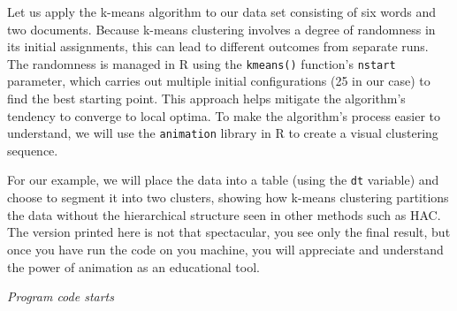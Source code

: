 Let us apply the k-means algorithm to our data set consisting of
six words and two documents. Because k-means clustering involves a degree of
randomness in its initial assignments, this can lead to
different outcomes from separate runs. The randomness is managed in R
using the \texttt{kmeans()} function's \texttt{nstart} parameter, which
carries out multiple initial configurations (25 in our case) to find the
best starting point. This approach helps mitigate the algorithm's
tendency to converge to local optima. To make the algorithm's process
easier to understand, we will use the \texttt{animation} library in R to
create a visual clustering sequence.

For our example, we will place the data into a table (using the \texttt{dt}
variable) and choose to segment it into two clusters, showing how
k-means clustering partitions the data without the hierarchical structure seen in
other methods such as HAC. The version printed here is not that
spectacular, you see only the final result, but once you have run the
code on you machine, you will appreciate and understand the power of
animation as an educational tool.

\emph{Program code starts}

\begin{Shaded}
\begin{Highlighting}[]

\OtherTok{\textless{}{-}} \NormalTok{(}\NormalTok{, }\NormalTok{, }\NormalTok{, }\NormalTok{, }\NormalTok{, }\NormalTok{)}
\OtherTok{\textless{}{-}} \NormalTok{(}\NormalTok{, }\NormalTok{, }\NormalTok{, }\NormalTok{, }\NormalTok{, }\NormalTok{)}
\OtherTok{\textless{}{-}} \NormalTok{(}\NormalTok{, }\NormalTok{, }\NormalTok{, }\NormalTok{, }\NormalTok{, }\NormalTok{)}

\OtherTok{\textless{}{-}} \SpecialCharTok{\%\textgreater{}\%}
\SpecialCharTok{\%\textgreater{}\%}
  \StringTok{\textasciigrave{}}\StringTok{\textasciigrave{}}

\NormalTok{(}\NormalTok{)}

\NormalTok{)}
\end{Highlighting}
\end{Shaded}


